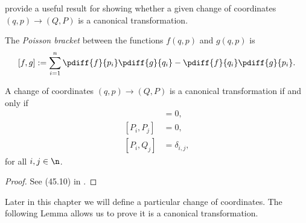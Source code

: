 \citet{landau_mechanics} provide a useful result for showing whether a given
change of coordinates \((q,p) \to (Q,P)\) is a canonical transformation.
\begin{defn}
    The \textit{Poisson bracket} between the functions \(f(q,p)\) and \(g(q,p)\)
    is
    \begin{equation}\label{eqn:poisson-bracket}
        [f,g] := \sum \limits_{i=1}^n \pdiff{f}{p_i}\pdiff{g}{q_i} - 
            \pdiff{f}{q_i}\pdiff{g}{p_i}
        .
    \end{equation}
\end{defn}
\begin{thm}\label{thm:canonical-transformations}
    A change of coordinates 
    \((q,p) \to (Q,P)\) is a canonical transformation if and only if
    \begin{align*}
        [Q_i, Q_j] &= 0
        , \\
        [P_i, P_j] &= 0
        , \\
        [P_i, Q_j] &= \delta_{i,j}
        , 
    \end{align*}
    for all \(i,j \in \n\).
\end{thm}
\begin{proof}
    See (45.10) in \cite{landau_mechanics}.
\end{proof}

Later in this chapter we will define a particular change of coordinates.
The following Lemma allows us to prove it is a canonical transformation.

